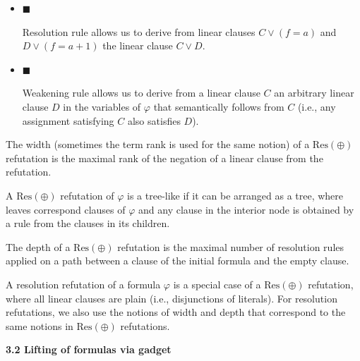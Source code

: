 \documentclass[10pt,a4paper]{article}
\begin{document}
\begin{itemize}


\item 
$\blacksquare$ 


Resolution rule allows us to derive from linear clauses $C\lor(f=a)$ and $D\lor(f=a+1)$ the linear clause $C\lor D$.\par





\item 
$\blacksquare$ 


Weakening rule allows us to derive from a linear clause $C$ an arbitrary linear clause $D$ in the variables of $\varphi$ that semantically follows from $C$ (i.e., any assignment satisfying $C$ also satisfies $D$).\par





\end{itemize}



The width (sometimes the term rank is used for the same notion) of a $\mathrm{Res}(\oplus)$ refutation is the maximal rank of the negation of a linear clause from the refutation.\par



A $\mathrm{Res}(\oplus)$ refutation of $\varphi$ is a tree-like if it can be arranged as a tree, where leaves correspond clauses of $\varphi$ and any clause in the interior node is obtained by a rule from the clauses in its children.\par



The depth of a $\mathrm{Res}(\oplus)$ refutation is the
maximal number of resolution rules applied on a path between a clause of the initial formula and the empty clause.\par



A resolution refutation of a formula $\varphi$ is a special case of a $\mathrm{Res}(\oplus)$ refutation, where all linear clauses are plain (i.e., disjunctions of literals). For resolution refutations, we also use the notions of width and depth that correspond to the same notions in $\mathrm{Res}(\oplus)$ refutations.\par


\par\medskip\noindent\textbf{
3.2 Lifting of formulas via gadget}\par
\end{document}
